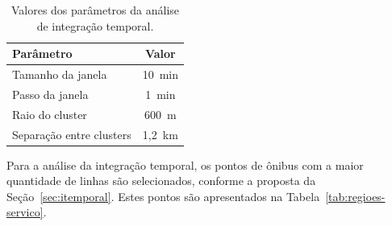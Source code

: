 


\begin{table}[htb]
    \caption{Valores dos parâmetros da análise de integração temporal.}
    \centering
    \begin{tabular}{lc} 
        \hline
        Parâmetro & Valor\\
        \hline
        Tamanho da janela & 10~min \\
        Passo da janela & 1~min \\
        Raio do cluster & 600~m  \\
        Separação entre clusters  & 1,2~km \\
        \hline  
    \end{tabular}
    \label{tab:parv}
\end{table}



    
    
    
    

Para a análise da integração temporal, os pontos de ônibus com a maior quantidade de linhas são selecionados, conforme a proposta da Seção~\ref{sec:itemporal}. Estes pontos são apresentados na Tabela~\ref{tab:regioes-servico}. 


